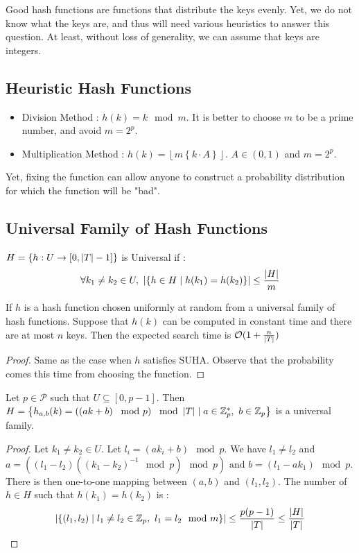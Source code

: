\documentclass{cours}
\begin{document}
Good hash functions are functions that distribute the keys evenly. Yet, we do not know what the keys are, and thus will need various heuristics to answer this question. At least, without loss of generality, we can assume that keys are integers.

\subsection{Heuristic Hash Functions}
\begin{itemize}
    \item Division Method : $h(k) = k \mod m$. It is better to choose $m$ to be a prime number, and avoid $m = 2^{p}$.
    \item Multiplication Method : $h(k) = \left\lfloor m \left\{k\cdot A\right\}\right\rfloor$. $A \in (0, 1)$ and $m = 2^{p}$.
\end{itemize}
Yet, fixing the function can allow anyone to construct a probability distribution for which the function will be "bad".

\subsection{Universal Family of Hash Functions}
$H = \left\{h : U \rightarrow \left[0, \left|T\right|-1\right]\right\}$ is Universal if :
\[
    \forall k_{1} \neq k_{2} \in U, \ \left|\left\{h \in H \mid h(k_{1}) = h(k_{2})\right\}\right| \leq \frac{\left|H\right|}{m}
\]
\begin{theorem}
    If $h$ is a hash function chosen uniformly at random from a universal family of hash functions. Suppose that $h(k)$ can be computed in constant time and there are at most $n$ keys. Then the expected search time is $\mathcal{O}(1 + \frac{n}{\left|T\right|})$
\end{theorem}
\begin{proof}
    Same as the case when $h$ satisfies SUHA. Observe that the probability comes this time from choosing the function.
\end{proof}

\begin{theorem}
    Let $p \in \mathcal{P}$ such that $U \subseteq \left[0, p-1\right]$. Then $H = \left\{h_{a, b}(k) = \left(\left(ak + b\right) \mod p\right) \mod \abs{T} \mid a \in \Z_{p}^{*}, \ b \in \Z_{p} \right\}$ is a universal family.
\end{theorem}
\begin{proof}
    Let $k_{1} \neq k_{2} \in U$. Let $l_{i} = (ak_{i} + b) \mod p$. We have $l_{1} \neq l_{2}$ and $ a = ((l_{1} - l_{2})((k_{1}-k_{2})^{-1} \mod p) \mod p) \text{ and } b = (l_{1} - ak_{1}) \mod p$. There is then one-to-one mapping between $(a, b)$ and $(l_{1}, l_{2})$. The number of $h \in H$ such that $h(k_{1}) = h(k_{2})$ is :
    \[
        \left|\left\{(l_{1}, l_{2})\mid l_{1} \neq l_{2} \in \mathbb{Z}_{p}, \ l_{1} = l_{2} \mod m \right\}\right| \leq \frac{p(p-1)}{\left|T\right|} \leq \frac{\left|H\right|}{\left|T\right|}
    \]
\end{proof}
\end{document}
